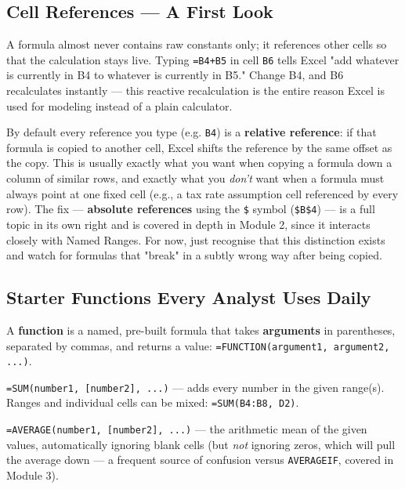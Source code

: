 \documentclass[11pt,a4paper]{article}
\begin{document}
\subsection{Cell References --- A First Look}

A formula almost never contains raw constants only; it references other cells so that the calculation stays live. Typing \texttt{=B4+B5} in cell \texttt{B6} tells Excel "add whatever is currently in B4 to whatever is currently in B5." Change B4, and B6 recalculates instantly --- this reactive recalculation is the entire reason Excel is used for modeling instead of a plain calculator.

\begin{keyconcept}
By default every reference you type (e.g. \texttt{B4}) is a \textbf{relative reference}: if that formula is copied to another cell, Excel shifts the reference by the same offset as the copy. This is usually exactly what you want when copying a formula down a column of similar rows, and exactly what you \emph{don't} want when a formula must always point at one fixed cell (e.g., a tax rate assumption cell referenced by every row). The fix --- \textbf{absolute references} using the \texttt{\$} symbol (\texttt{\$B\$4}) --- is a full topic in its own right and is covered in depth in Module 2, since it interacts closely with Named Ranges. For now, just recognise that this distinction exists and watch for formulas that "break" in a subtly wrong way after being copied.
\end{keyconcept}

\subsection{Starter Functions Every Analyst Uses Daily}

A \textbf{function} is a named, pre-built formula that takes \textbf{arguments} in parentheses, separated by commas, and returns a value: \texttt{=FUNCTION(argument1, argument2, ...)}.

\begin{formulasyntax}[SUM]
\texttt{=SUM(number1, [number2], ...)} --- adds every number in the given range(s). Ranges and individual cells can be mixed: \texttt{=SUM(B4:B8, D2)}.
\end{formulasyntax}

\begin{formulasyntax}[AVERAGE]
\texttt{=AVERAGE(number1, [number2], ...)} --- the arithmetic mean of the given values, automatically ignoring blank cells (but \emph{not} ignoring zeros, which will pull the average down --- a frequent source of confusion versus \texttt{AVERAGEIF}, covered in Module 3).
\end{formulasyntax}
\end{document}
